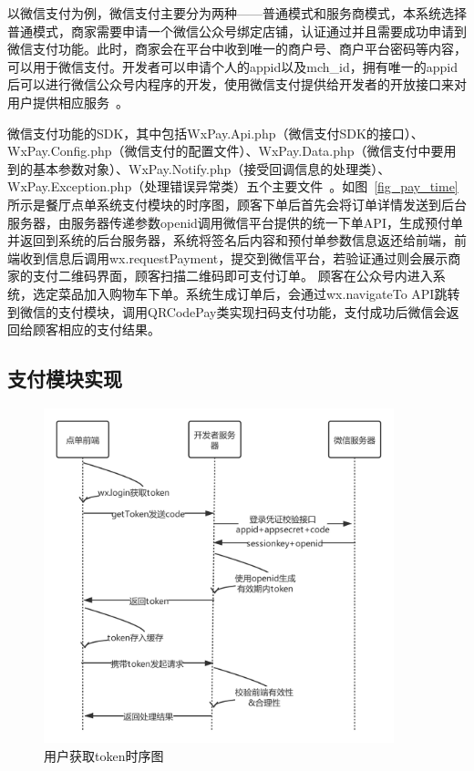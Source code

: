 以微信支付为例，微信支付主要分为两种——普通模式和服务商模式，本系统选择普通模式，商家需要申请一个微信公众号绑定店铺，认证通过并且需要成功申请到微信支付功能。此时，商家会在平台中收到唯一的商户号、商户平台密码等内容，可以用于微信支付。开发者可以申请个人的appid以及mch\_id，拥有唯一的appid后可以进行微信公众号内程序的开发，使用微信支付提供给开发者的开放接口来对用户提供相应服务~\cite{fff}。

微信支付功能的SDK，其中包括WxPay.Api.php（微信支付SDK的接口）、WxPay.Config.php（微信支付的配置文件）、WxPay.Data.php（微信支付中要用到的基本参数对象）、WxPay.Notify.php（接受回调信息的处理类）、WxPay.Exception.php（处理错误异常类）五个主要文件~\cite{czz2018}。如图~\ref{fig_pay_time}所示是餐厅点单系统支付模块的时序图，顾客下单后首先会将订单详情发送到后台服务器，由服务器传递参数openid调用微信平台提供的统一下单API，生成预付单并返回到系统的后台服务器，系统将签名后内容和预付单参数信息返还给前端，前端收到信息后调用wx.requestPayment，提交到微信平台，若验证通过则会展示商家的支付二维码界面，顾客扫描二维码即可支付订单。
顾客在公众号内进入系统，选定菜品加入购物车下单。系统生成订单后，会通过wx.navigateTo API跳转到微信的支付模块，调用QRCodePay类实现扫码支付功能，支付成功后微信会返回给顾客相应的支付结果。\\

\subsection{支付模块实现}
\begin{figure}[htbp!]
    \centering
    \includegraphics[width=4in]{FIGs/chapter4/pay_token.pdf}
    \caption{用户获取token时序图}\label{fig_pay_token}
\end{figure}

